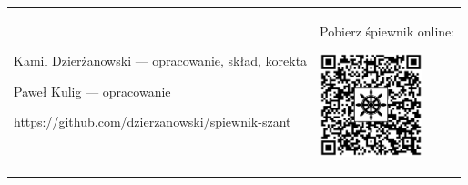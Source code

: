 \documentclass[11pt, twoside]{book}
\begin{document}
\tableofcontents
\vfill
\renewcommand{\tabularxcolumn}[1]{>{\small}b{#1}}
\begin{adjustbox}{width={\textwidth}, keepaspectratio}
\begin{tabularx}{\textwidth}{%
        @{}
        >{\raggedright\arraybackslash}X
        @{}
        >{\raggedleft\arraybackslash}X
    }
    \footnotesize
    Kamil Dzierżanowski --- opracowanie, skład, korekta

    Paweł Kulig --- opracowanie

    \medskip

    https://github.com/dzierzanowski/spiewnik-szant

    &

    Pobierz śpiewnik online:

    \includegraphics[width=3cm]{images/qr.png}
\end{tabularx}
\end{adjustbox}

\end{document}
